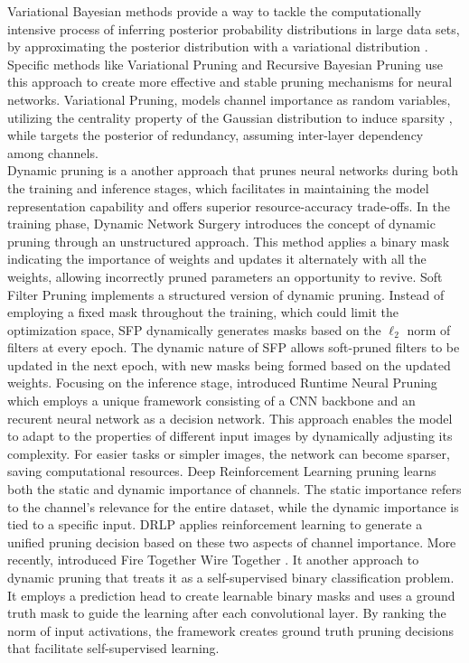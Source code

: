 Variational Bayesian methods provide a way to tackle the computationally
intensive process of inferring posterior probability distributions in large data
sets, by approximating the posterior distribution with a variational
distribution \cite{fox2012tutorial}. Specific methods like Variational Pruning
\cite{DBLP:conf/cvpr/ZhaoNZZZT19} and Recursive Bayesian Pruning
\cite{DBLP:conf/iccv/Zhou0W019} use this approach to create more effective and
stable pruning mechanisms for neural networks. Variational Pruning, models
channel importance as random variables, utilizing the centrality property of the
Gaussian distribution to induce sparsity \cite{DBLP:conf/cvpr/ZhaoNZZZT19},
while \cite{DBLP:conf/iccv/Zhou0W019} targets the posterior of redundancy,
assuming inter-layer dependency among channels.\\


Dynamic pruning is a another approach that prunes neural networks during both
the training and inference stages, which facilitates in maintaining the model
representation capability and offers superior resource-accuracy trade-offs. In
the training phase, Dynamic Network Surgery \cite{DBLP:conf/nips/GuoYC16}
introduces the concept of dynamic pruning through an unstructured approach. This
method applies a binary mask indicating the importance of weights and updates it
alternately with all the weights, allowing incorrectly pruned parameters an
opportunity to revive. Soft Filter Pruning \cite{DBLP:conf/ijcai/HeKDFY18}
implements a structured version of dynamic pruning. Instead of employing a fixed
mask throughout the training, which could limit the optimization space, SFP
dynamically generates masks based on the $\ell_2$ norm of filters at every
epoch. The dynamic nature of SFP allows soft-pruned filters to be updated in the
next epoch, with new masks being formed based on the updated weights. Focusing
on the inference stage, \citeauthor{DBLP:conf/nips/LinRLZ17} introduced Runtime
Neural Pruning \cite{DBLP:conf/nips/LinRLZ17} which employs a unique framework
consisting of a \ac{CNN} backbone and an recurent neural network as a decision
network. This approach enables the model to adapt to the properties of different
input images by dynamically adjusting its complexity. For easier tasks or
simpler images, the network can become sparser, saving computational resources.
Deep Reinforcement Learning pruning \cite{DBLP:conf/nips/ChenCP20} learns both
the static and dynamic importance of channels. The static importance refers to
the channel's relevance for the entire dataset, while the dynamic importance is
tied to a specific input. DRLP applies reinforcement learning to generate a
unified pruning decision based on these two aspects of channel importance. More
recently, \citeauthor{DBLP:conf/cvpr/ElkerdawyE0R22} introduced Fire Together
Wire Together \cite{DBLP:conf/cvpr/ElkerdawyE0R22}. It another approach to
dynamic pruning that treats it as a self-supervised binary classification
problem. It employs a prediction head to create learnable binary masks and uses
a ground truth mask to guide the learning after each convolutional layer. By
ranking the norm of input activations, the framework creates ground truth
pruning decisions that facilitate self-supervised learning. \\

